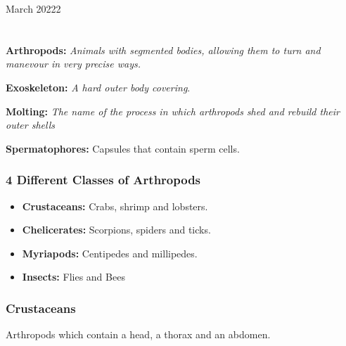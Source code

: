 \documentclass[12pt,oneside]{book} %
\begin{document}
	\renewcommand*{\term}{Term 2} %
	\renewcommand*{\coursecode}{MCR3U} %
	\renewcommand*{\coursename}{Course Name} %
	\renewcommand*{\thelecnum}{4} %
	\renewcommand*{\profname}{Prof Name} %
	\renewcommand*{\colink}{http://www.student.math.uwaterloo.ca/~c2kent} %
	\clearpage
	\pagestyle{classlecture}
\begin{lec}{March 20222}
	\chapter{\chapname\chaplec}
  \textbf{Arthropods:} \textit{Animals with segmented bodies, allowing them to
    turn and manevour in very precise ways.}


  \textbf{Exoskeleton:} \textit{A hard outer body covering}.

  \textbf{Molting:} \textit{The name of the process in which arthropods shed and rebuild their outer shells}

  \textbf{Spermatophores:} Capsules that contain sperm cells.

  \subsection*{4 Different Classes  of Arthropods}

  \begin{itemize}
    \item \textbf{Crustaceans:} Crabs, shrimp and lobsters.
    \item \textbf{Chelicerates:} Scorpions, spiders and ticks.
    \item \textbf{Myriapods:} Centipedes and millipedes.
    \item \textbf{Insects:} Flies and Bees
  \end{itemize}
  
  \subsection*{Crustaceans}
  Arthropods which contain a head, a thorax and an abdomen.\newline


\end{lec}
\end{document}

